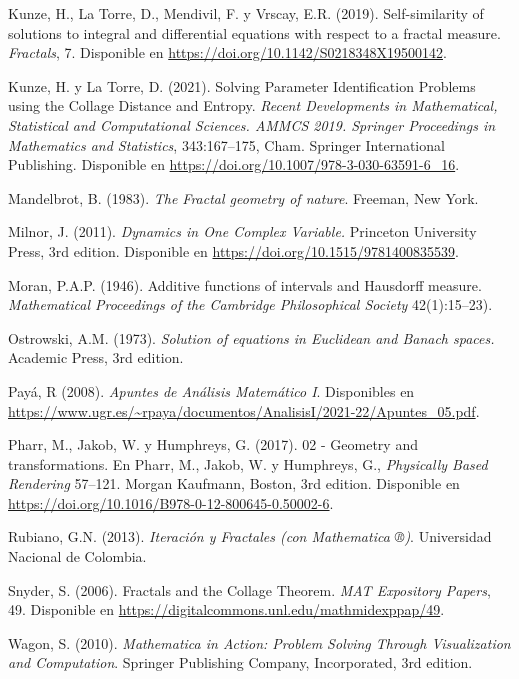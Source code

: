\begin{thebibliography}{99}
     Kunze, H., La Torre, D., Mendivil, F. y Vrscay, E.R. (2019). Self-similarity of solutions to integral and differential equations with respect to a fractal measure. \textit{Fractals}, 7. Disponible en \url{https://doi.org/10.1142/S0218348X19500142}.

     Kunze, H. y La Torre, D. (2021). Solving Parameter Identification Problems using the Collage Distance and Entropy. \textit{Recent Developments in Mathematical, Statistical and Computational Sciences. AMMCS 2019. Springer Proceedings in Mathematics and Statistics}, 343:167--175, Cham. Springer International Publishing. Disponible en \url{https://doi.org/10.1007/978-3-030-63591-6_16}.

     Mandelbrot, B. (1983). \textit{The Fractal geometry of nature}. Freeman, New York.

     Milnor, J. (2011). \textit{Dynamics in One Complex Variable.} Princeton University Press, 3rd edition. Disponible en \url{https://doi.org/10.1515/9781400835539}.

    Moran, P.A.P. (1946). Additive functions of intervals and Hausdorff measure. \textit{Mathematical Proceedings of the Cambridge Philosophical Society} 42(1):15--23).

     Ostrowski, A.M. (1973). \textit{Solution of equations in Euclidean and Banach spaces.} Academic Press, 3rd edition.

     Payá, R (2008). \textit{Apuntes de Análisis Matemático I}. Disponibles en \url{https://www.ugr.es/~rpaya/documentos/AnalisisI/2021-22/Apuntes_05.pdf}.

     Pharr, M., Jakob, W. y Humphreys, G. (2017). 02 - Geometry and transformations. En Pharr, M., Jakob, W. y Humphreys, G., \textit{Physically Based Rendering} 57--121. Morgan Kaufmann, Boston, 3rd edition. Disponible en \url{https://doi.org/10.1016/B978-0-12-800645-0.50002-6}. 

     Rubiano, G.N. (2013). \textit{Iteración y Fractales (con Mathematica ®)}. Universidad Nacional de Colombia.

     Snyder, S. (2006). Fractals and the Collage Theorem. \textit{MAT Expository Papers}, 49. Disponible en \url{https://digitalcommons.unl.edu/mathmidexppap/49}.

    Wagon, S. (2010). \textit{Mathematica in Action: Problem Solving Through Visualization and Computation}. Springer Publishing Company, Incorporated, 3rd edition.


\end{thebibliography}
